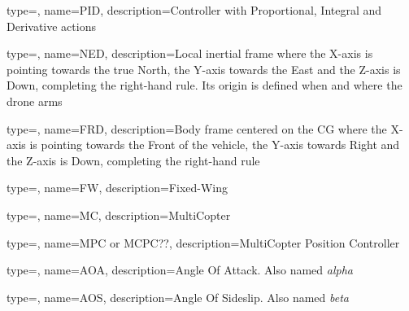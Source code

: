 {
	type=\acronymtype,
	name={PID},
	description={Controller with Proportional, Integral and Derivative actions}
}

{
	type=\acronymtype,
	name={NED},
	description={Local inertial frame where the X-axis is pointing towards the true North, the Y-axis towards the East and the Z-axis is Down, completing the right-hand rule. Its origin is defined when and where the drone arms}
}

{
	type=\acronymtype,
	name={FRD},
	description={Body frame centered on the CG where the X-axis is pointing towards the Front of the vehicle, the Y-axis towards Right and the Z-axis is Down, completing the right-hand rule}
}

{
	type=\acronymtype,
	name={FW},
	description={Fixed-Wing}
}

{
	type=\acronymtype,
	name={MC},
	description={MultiCopter}
}

{
	type=\acronymtype,
	name={MPC or MCPC??},
	description={MultiCopter Position Controller}
}

{
	type=\acronymtype,
	name={AOA},
	description={Angle Of Attack. Also named \textit{alpha}}
}

{
	type=\acronymtype,
	name={AOS},
	description={Angle Of Sideslip. Also named \textit{beta}}
}
